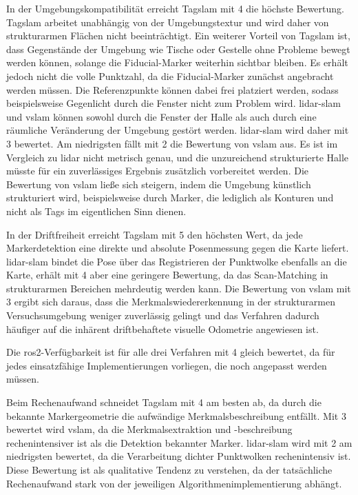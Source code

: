 In der Umgebungskompatibilität erreicht Tag\gls{slam} mit 4 die höchste Bewertung.
Tag\gls{slam} arbeitet unabhängig von der Umgebungstextur und wird daher von strukturarmen Flächen nicht beeinträchtigt.
Ein weiterer Vorteil von Tag\gls{slam} ist, dass Gegenstände der Umgebung wie Tische oder Gestelle ohne Probleme bewegt werden können, solange die Fiducial-Marker weiterhin sichtbar bleiben.
Es erhält jedoch nicht die volle Punktzahl, da die Fiducial-Marker zunächst angebracht werden müssen.
Die Referenzpunkte können dabei frei platziert werden, sodass beispielsweise Gegenlicht durch die Fenster nicht zum Problem wird.
\gls{lidar}-\gls{slam} und \gls{vslam} können sowohl durch die Fenster der Halle als auch durch eine räumliche Veränderung der Umgebung gestört werden.
\gls{lidar}-\gls{slam} wird daher mit 3 bewertet.
Am niedrigsten fällt mit 2 die Bewertung von \gls{vslam} aus.
Es ist im Vergleich zu \gls{lidar} nicht metrisch genau, und die unzureichend strukturierte Halle müsste für ein zuverlässiges Ergebnis zusätzlich vorbereitet werden.
Die Bewertung von \gls{vslam} ließe sich steigern, indem die Umgebung künstlich strukturiert wird, beispielsweise durch Marker, die lediglich als Konturen und nicht als Tags im eigentlichen Sinn dienen.

In der Driftfreiheit erreicht Tag\gls{slam} mit 5 den höchsten Wert, da jede Markerdetektion eine direkte und absolute Posenmessung gegen die Karte liefert.
\gls{lidar}-\gls{slam} bindet die Pose über das Registrieren der Punktwolke ebenfalls an die Karte, erhält mit 4 aber eine geringere Bewertung, 
da das Scan-Matching in strukturarmen Bereichen mehrdeutig werden kann.
Die Bewertung von \gls{vslam} mit 3 ergibt sich daraus, dass die Merkmalswiedererkennung in der strukturarmen Versuchsumgebung weniger zuverlässig 
gelingt und das Verfahren dadurch häufiger auf die inhärent driftbehaftete visuelle Odometrie angewiesen ist.~\cite{10588822_RWT_SLAM,Tang2015_lidar}

Die \gls{ros2}-Verfügbarkeit ist für alle drei Verfahren mit 4 gleich bewertet, da für jedes einsatzfähige Implementierungen vorliegen, 
die noch angepasst werden müssen.

Beim Rechenaufwand schneidet Tag\gls{slam} mit 4 am besten ab, da durch die bekannte Markergeometrie die aufwändige Merkmalsbeschreibung entfällt.
Mit 3 bewertet wird \gls{vslam}, da die Merkmalsextraktion und -beschreibung rechenintensiver ist als die Detektion bekannter Marker.
\gls{lidar}-\gls{slam} wird mit 2 am niedrigsten bewertet, da die Verarbeitung dichter Punktwolken rechenintensiv ist.
Diese Bewertung ist als qualitative Tendenz zu verstehen, da der tatsächliche Rechenaufwand stark von der jeweiligen Algorithmenimplementierung abhängt.





